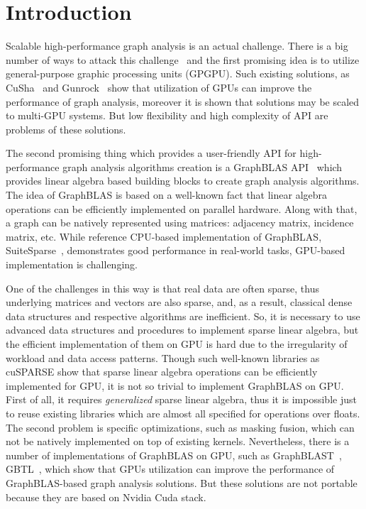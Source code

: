 \section{Introduction}

Scalable high-performance graph analysis is an actual challenge.
There is a big number of ways to attack this challenge~\cite{Coimbra2021} and the first promising idea is to utilize general-purpose graphic processing units (GPGPU).
Such existing solutions, as CuSha~\cite{10.1145/2600212.2600227} and Gunrock~\cite{7967137} show that utilization of GPUs can improve the performance of graph analysis, moreover it is shown that solutions may be scaled to multi-GPU systems.
But low flexibility and high complexity of API are problems of these solutions.

The second promising thing which provides a user-friendly API for high-performance graph analysis algorithms creation is a GraphBLAS API~\cite{7761646} which provides linear algebra based building blocks to create graph analysis algorithms.
The idea of GraphBLAS is based on a well-known fact that linear algebra operations can be efficiently implemented on parallel hardware.
Along with that, a graph can be natively represented using matrices: adjacency matrix, incidence matrix, etc.
While reference CPU-based implementation of GraphBLAS, SuiteSparse~\cite{10.1145/3322125}, demonstrates good performance in real-world tasks, GPU-based implementation is challenging.

One of the challenges in this way is that real data are often sparse, thus underlying matrices and vectors are also sparse, and, as a result, classical dense data structures and respective algorithms are inefficient. 
So, it is necessary to use advanced data structures and procedures to implement sparse linear algebra, but the efficient implementation of them on GPU is hard due to the irregularity of workload and data access patterns.
Though such well-known libraries as cuSPARSE show that sparse linear algebra operations can be efficiently implemented for GPU, it is not so trivial to implement GraphBLAS on GPU. 
First of all, it requires \textit{generalized} sparse linear algebra, thus it is impossible just to reuse existing libraries which are almost all specified for operations over floats.
The second problem is specific optimizations, such as masking fusion, which can not be natively implemented on top of existing kernels.
Nevertheless, there is a number of implementations of GraphBLAS on GPU, such as GraphBLAST~\cite{yang2019graphblast}, GBTL~\cite{7529957}, which show that GPUs utilization can improve the performance of GraphBLAS-based graph analysis solutions.
But these solutions are not portable because they are based on Nvidia Cuda stack.

